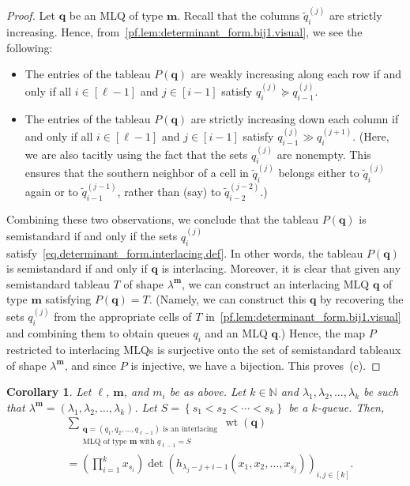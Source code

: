 \documentclass[reqno]{amsart}
\newcommand{\0}{\phantom{c}}
\DeclareMathOperator{\wt}{wt} %
\newcommand{\mm}{\mathbf{m}}
\newcommand{\qq}{\mathbf{q}}
\newcommand{\NN}{\mathbb{N}}
\let\sumnonlimits\sum
\let\prodnonlimits\prod
\renewcommand{\sum}{\sumnonlimits\limits}
\renewcommand{\prod}{\prodnonlimits\limits}
\newcommand{\set}[1]{\left\{ #1 \right\}}
\newcommand{\tup}[1]{\left( #1 \right)}
\newcommand{\ive}[1]{\left[ #1 \right]}
\theoremstyle{plain}
\newtheorem{cor}[thm]{Corollary}
\theoremstyle{definition}
\numberwithin{equation}{section}
\begin{document}
\begin{proof}
Let $\qq$ be an MLQ of type $\mm$.
Recall that the columns $\widetilde{q}_i^{(j)}$ are strictly increasing.
Hence, from~\eqref{pf.lem:determinant_form.bij1.visual}, we see the following:
\begin{itemize}
\item The entries of the tableau $P(\qq)$ are weakly increasing along each row if and only if all $i \in \ive{\ell-1}$ and $j \in \ive{i-1}$ satisfy $q_i^{(j)} \succeq q_{i-1}^{(j)}$.
\item The entries of the tableau $P(\qq)$ are strictly increasing down each column if and only if all $i \in \ive{\ell-1}$ and $j \in \ive{i-1}$ satisfy $q_{i-1}^{(j)} \gg q_i^{(j+1)}$.
  (Here, we are also tacitly using the fact that the sets $q_i^{(j)}$ are nonempty.
  This ensures that the southern neighbor of a cell in $\widetilde{q}_i^{(j)}$ belongs either to $\widetilde{q}_i^{(j)}$ again or to $\widetilde{q}_{i-1}^{(j-1)}$, rather than (say) to $\widetilde{q}_{i-2}^{(j-2)}$.)
\end{itemize}
Combining these two observations, we conclude that the tableau $P(\qq)$ is semistandard if and only if the sets $q_i^{(j)}$ satisfy~\eqref{eq.determinant_form.interlacing.def}.
In other words, the tableau $P(\qq)$ is semistandard if and only if $\qq$ is interlacing.
Moreover, it is clear that given any semistandard tableau $T$ of shape $\lambda^{\mm}$, we can construct an interlacing MLQ $\qq$ of type $\mm$ satisfying $P(\qq) = T$.
(Namely, we can construct this $\qq$ by recovering the sets $q_i^{(j)}$ from the appropriate cells of $T$ in~\eqref{pf.lem:determinant_form.bij1.visual} and combining them to obtain queues $q_i$ and an MLQ $\qq$.)
Hence, the map $P$ restricted to interlacing MLQs is surjective onto the set of semistandard tableaux of shape $\lambda^{\mm}$, and since $P$ is injective, we have a bijection.
This proves~(c).
\end{proof}

\begin{cor}
\label{cor:determinant_form.bij1c}
Let $\ell$, $\mm$, and $m_i$ be as above.
Let $k \in \NN$ and $\lambda_1, \lambda_2, \ldots, \lambda_k$ be such that $\lambda^{\mm} = \tup{\lambda_1, \lambda_2, \dotsc, \lambda_k}$.
Let $S = \set{s_1 < s_2 < \cdots < s_k}$ be a $k$-queue.
Then,
\begin{align*}
&  \sum_{\substack{\qq=\tup{q_1,q_2,\ldots,q_{\ell-1}} \text{ is an interlacing}\\\text{MLQ of type $\mm$ with } q_{\ell-1}=S}} \wt(\qq) \\
&  = \left(  \prod_{i=1}^{k}x_{s_i}\right)
    \det\left(h_{\lambda_j-j+i-1}(x_1, x_2, \dotsc, x_{s_j}) \right)_{i, j \in \ive{k}} .
\end{align*}
\end{cor}
\end{document}
